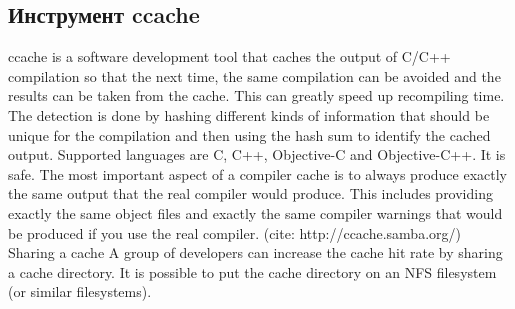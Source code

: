 \subsection{Инструмент ccache}
ccache is a software development tool that caches the output of C/C++ compilation so that the next time, the same compilation can be avoided and the results can be taken from the cache. This can greatly speed up recompiling time. The detection is done by hashing different kinds of information that should be unique for the compilation and then using the hash sum to identify the cached output. Supported languages are C, C++, Objective-C and Objective-C++. It is safe. The most important aspect of a compiler cache is to always produce exactly the same output that the real compiler would produce. This includes providing exactly the same object files and exactly the same compiler warnings that would be produced if you use the real compiler. (cite: http://ccache.samba.org/)
Sharing a cache
A group of developers can increase the cache hit rate by sharing a cache directory. It is possible to put the cache directory on an NFS filesystem (or similar filesystems).
